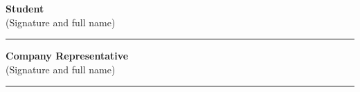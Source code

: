 \vspace{1cm}

\begin{center}
\begin{minipage}[t]{0.4\textwidth}
    \centering
    \textbf{Student}\\[0.2cm]
    (Signature and full name)

    \vspace{2.5cm}

    \rule{0.8\linewidth}{0.4pt}
\end{minipage}
\hfill
\begin{minipage}[t]{0.4\textwidth}
    \centering
    \textbf{Company Representative}\\[0.2cm]
    (Signature and full name)

    \vspace{2.5cm}

    \rule{0.8\linewidth}{0.4pt}
\end{minipage}
\end{center}